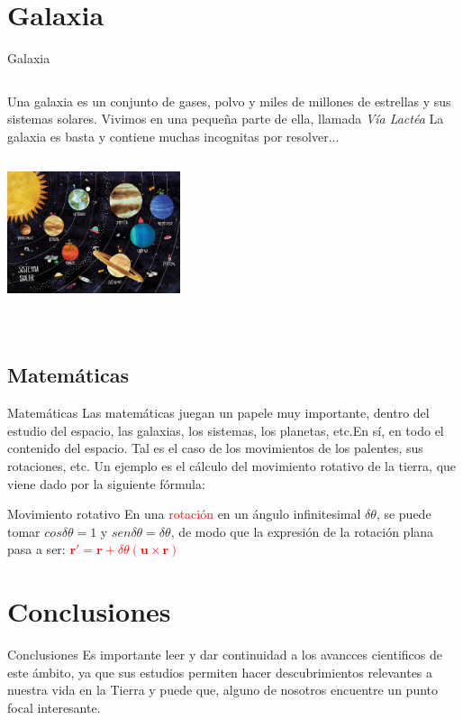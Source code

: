 \documentclass[11pt,xcolor=pdftex,dvinames,table]{beamer}
\begin{document}
    \section{Galaxia}
		\begin{frame}{Galaxia}
			\begin{columns}
                \column{2in}
                Una galaxia es un conjunto de gases, polvo y miles de millones de estrellas y sus sistemas solares.
                Vivimos en una pequeña parte de ella, llamada \textit{Vía Lactéa}
                La galaxia es basta y contiene muchas incognitas por resolver...
                \column{2in}
                \includegraphics[height=2.0in,width=2.0in]{galaxia.jpg}
            \end{columns}
		\end{frame}
	\subsection{Matemáticas}	
	    \begin{frame}{Matemáticas}
			\justifying
			Las matemáticas juegan un papele muy importante, dentro del estudio del espacio, las galaxias, los sistemas, los planetas, etc.En sí, en todo el contenido del espacio. Tal es el caso de los movimientos de los palentes, sus rotaciones, etc. Un ejemplo es el cálculo del movimiento rotativo de la tierra, que viene dado por la siguiente fórmula:
            \begin{block}{Movimiento rotativo}
                En una \textcolor{red}{rotación} en un ángulo infinitesimal $\delta \theta$, se puede tomar $cos \delta \theta = 1$ y $sen \delta \theta = \delta \theta$, de modo que la expresión de la rotación plana pasa a ser:
                \textcolor{red}{${\displaystyle \mathbf {r} '=\mathbf {r} +\delta \theta (\mathbf {u} \times \mathbf {r} )}$}
            \end{block}
    	\end{frame}
    \section{Conclusiones}
        \begin{frame}{Conclusiones}
        Es importante leer y dar continuidad a los avancces cientificos de este ámbito, ya que sus estudios permiten hacer descubrimientos relevantes a nuestra vida en la Tierra y puede que, alguno de nosotros encuentre un punto focal interesante.
        \end{frame}
\end{document}

